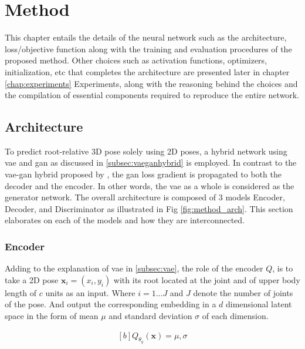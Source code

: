 \chapter{Method}
\label{chap:method}

This chapter entails the details of the neural network such as the architecture, loss/objective function along with the training and evaluation procedures of the proposed method. Other choices such as activation functions, optimizers, initialization, etc that completes the architecture are presented later in chapter \ref{chap:experiments} Experiments, along with the reasoning behind the choices and the compilation of essential components required to reproduce the entire network.

\section{Architecture}
To predict root-relative 3D pose solely using 2D poses, a hybrid network using \ac{vae} and \ac{gan} as discussed in \ref{subsec:vaeganhybrid} is employed. In contrast to the \ac{vae}-\ac{gan} hybrid proposed by \cite{autoencoding_beyond_pixels}, the \ac{gan} loss gradient is propagated to both the decoder and the encoder. In other words, the \ac{vae} as a whole is considered as the generator network. The overall architecture is composed of 3 models Encoder, Decoder, and Discriminator as illustrated in Fig \ref{fig:method_arch}. This section elaborates on each of the models and how they are interconnected. 

\subsection{Encoder}
Adding to the explanation of \ac{vae} in \ref{subsec:vae}, the role of the encoder $Q$, is to take a 2D pose $\textbf{x}_i = (x_i, y_i)$ with its root located at the joint and of upper body length of $c$ units as an input. Where $i = 1 ... J$ and $J$ denote the number of joints of the pose. And output the corresponding embedding in a $d$ dimensional latent space in the form of mean $\mu$ and standard deviation $\sigma$ of each dimension.

\begin{equation} \label{eqn:Q_fn}
    \begin{gathered}[b]
        Q_{\theta_q}(\textbf{x}) = \mu, \sigma
    \end{gathered}
\end{equation}

